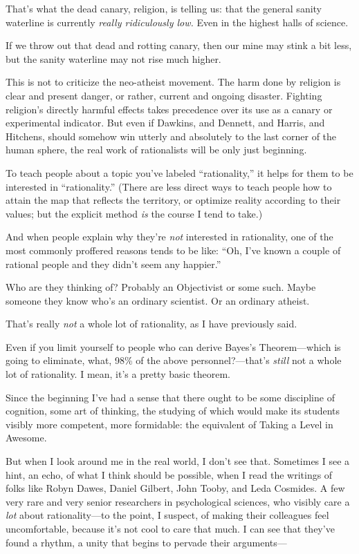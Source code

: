 {
 That's what the dead canary, religion, is telling
us: that the general sanity waterline is currently \textit{really
ridiculously low.} Even in the highest halls of science.}

{
 If we throw out that dead and rotting canary, then our mine may
stink a bit less, but the sanity waterline may not rise much higher.}

{
 This is not to criticize the neo-atheist movement. The harm done
by religion is clear and present danger, or rather, current and ongoing
disaster. Fighting religion's directly harmful effects
takes precedence over its use as a canary or experimental indicator.
But even if Dawkins, and Dennett, and Harris, and Hitchens, should
somehow win utterly and absolutely to the last corner of the human
sphere, the real work of rationalists will be only just beginning.}

\myendsectiontext


{
 To teach people about a topic you've labeled
``rationality,'' it helps for them
to be interested in ``rationality.''
(There are less direct ways to teach people how to attain the map that
reflects the territory, or optimize reality according to their values;
but the explicit method \textit{is} the course I tend to take.) }

{
 And when people explain why they're \textit{not}
interested in rationality, one of the most commonly proffered reasons
tends to be like: ``Oh, I've known a
couple of rational people and they didn't seem any
happier.''}

{
 Who are they thinking of? Probably an Objectivist or some such.
Maybe someone they know who's an ordinary scientist. Or
an ordinary atheist.}

{
 That's really \textit{not} a whole lot of
rationality, as I have previously said.}

{
 Even if you limit yourself to people who can derive
Bayes's Theorem---which is going to eliminate, what,
98\% of the above personnel?---that's \textit{still}
not a whole lot of rationality. I mean, it's a pretty
basic theorem.}

{
 Since the beginning I've had a sense that there
ought to be some discipline of cognition, some art of thinking, the
studying of which would make its students visibly more competent, more
formidable: the equivalent of Taking a Level in Awesome.}

{
 But when I look around me in the real world, I
don't see that. Sometimes I see a hint, an echo, of
what I think should be possible, when I read the writings of folks like
Robyn Dawes, Daniel Gilbert, John Tooby, and Leda Cosmides. A few very
rare and very senior researchers in psychological sciences, who visibly
care a \textit{lot} about rationality---to the point, I suspect, of
making their colleagues feel uncomfortable, because
it's not cool to care that much. I can see that
they've found a rhythm, a unity that begins to pervade
their arguments---}

